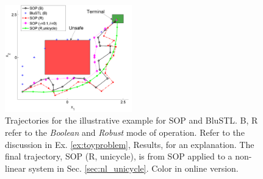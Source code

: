 \begin{figure}[t]
\centering
\includegraphics[width=0.49\textwidth]{figures/ToyExUni_scissored.pdf}
\vspace{-20pt}
\caption{{\small Trajectories for the illustrative example for SOP and BluSTL. B, R refer to the \textit{Boolean} and \textit{Robust} mode of operation. Refer to the discussion in Ex. \ref{ex:toyproblem}, Results, for an explanation. The final trajectory, SOP (R, unicycle), is from SOP applied to a non-linear system in Sec. \ref{sec:nl_unicycle}. Color in online version.}}
\label{fig:toy control}
\vspace{-10pt}
\end{figure}




